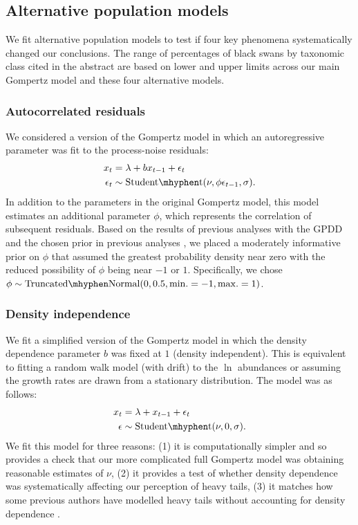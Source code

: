 \subsection{Alternative population models} We fit alternative population models to
test if four key phenomena systematically changed our conclusions. The range of
percentages of black swans by taxonomic class cited in the abstract are based
on lower and upper limits across our main Gompertz model and these four
alternative models.

\subsubsection{Autocorrelated residuals} We considered a version of the Gompertz
model in which an autoregressive parameter was fit to the process-noise
residuals: \begin{align} x_t &= \lambda + b x_{t-1} + \epsilon_t\\ \epsilon_t
&\sim \mathrm{Student\mhyphen t}(\nu, \phi \epsilon_{t-1}, \sigma). \end{align}
In addition to the parameters in the original Gompertz model, this model
estimates an additional parameter \(\phi\), which represents the correlation of
subsequent residuals. Based on the results of previous analyses with the
GPDD \citep{connors2014} and the chosen prior in previous
analyses \citep{thorson2014a}, we placed a moderately informative prior on
\(\phi\) that assumed the greatest probability density near zero with the
reduced possibility of \(\phi\) being near \(-1\) or \(1\). Specifically, we
chose \(\phi \sim \mathrm{Truncated\mhyphen Normal}(0, 0.5, \mathrm{min.} = -1,
\mathrm{max.} = 1)\).

\subsubsection{Density independence} We fit a simplified version of the
Gompertz model in which the density dependence parameter \(b\) was fixed at
\(1\) (density independent). This is equivalent to fitting a random walk model
(with drift) to the \(\ln\) abundances or assuming the growth rates are drawn
from a stationary distribution. The model was as follows:
\begin{align}
x_t &= \lambda + x_{t-1} + \epsilon_t\\
\epsilon &\sim \mathrm{Student\mhyphen t}(\nu, 0, \sigma).
\end{align}
We fit this model for three reasons: (1) it is computationally simpler and so
provides a check that our more complicated full Gompertz model was obtaining
reasonable estimates of \(\nu\), (2) it provides a test of whether density
dependence was systematically affecting our perception of heavy tails, (3) it
matches how some previous authors have modelled heavy tails without accounting
for density dependence \citep{segura2013}.

